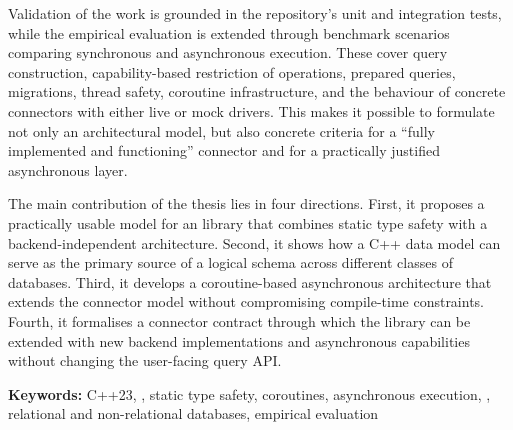 Validation of the work is grounded in the repository's unit and integration tests, while the empirical evaluation is extended through benchmark scenarios comparing synchronous and asynchronous execution. These cover query construction, capability-based restriction of operations, prepared queries, migrations, thread safety, coroutine infrastructure, and the behaviour of concrete connectors with either live or mock drivers. This makes it possible to formulate not only an architectural model, but also concrete criteria for a “fully implemented and functioning” connector and for a practically justified asynchronous layer.

The main contribution of the thesis lies in four directions. First, it proposes a practically usable model for an \ORMName{} library that combines static type safety with a backend-independent architecture. Second, it shows how a C++ data model can serve as the primary source of a logical schema across different classes of databases. Third, it develops a coroutine-based asynchronous architecture that extends the connector model without compromising compile-time constraints. Fourth, it formalises a connector contract through which the library can be extended with new backend implementations and asynchronous capabilities without changing the user-facing query API.

\vspace{1cm}

\textbf{Keywords:} C++23, \ORMName{}, static type safety, coroutines, asynchronous execution, , relational and non-relational databases, empirical evaluation
